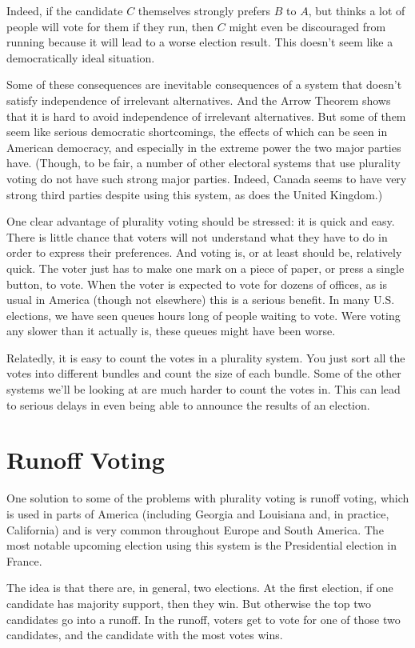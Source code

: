\begin{multicols}{2}
Indeed, if the candidate $C$ themselves strongly prefers $B$ to $A$, but thinks a lot of people will vote for them if they run, then $C$ might even be discouraged from running because it will lead to a worse election result. This doesn't seem like a democratically ideal situation.

Some of these consequences are inevitable consequences of a system that doesn't satisfy independence of irrelevant alternatives. And the Arrow Theorem shows that it is hard to avoid independence of irrelevant alternatives. But some of them seem like serious democratic shortcomings, the effects of which can be seen in American democracy, and especially in the extreme power the two major parties have. (Though, to be fair, a number of other electoral systems that use plurality voting do not have such strong major parties. Indeed, Canada seems to have very strong third parties despite using this system, as does the United Kingdom.)

One clear advantage of plurality voting should be stressed: it is quick and easy. There is little chance that voters will not understand what they have to do in order to express their preferences. And voting is, or at least should be, relatively quick. The voter just has to make one mark on a piece of paper, or press a single button, to vote. When the voter is expected to vote for dozens of offices, as is usual in America (though not elsewhere) this is a serious benefit. In many U.S. elections, we have seen queues hours long of people waiting to vote. Were voting any slower than it actually is, these queues might have been worse.

Relatedly, it is easy to count the votes in a plurality system. You just sort all the votes into different bundles and count the size of each bundle. Some of the other systems we'll be looking at are much harder to count the votes in. This can lead to serious delays in even being able to announce the results of an election.

\section{Runoff Voting}
One solution to some of the problems with plurality voting is runoff voting, which is used in parts of America (including Georgia and Louisiana and, in practice, California) and is very common throughout Europe and South America. The most notable upcoming election using this system is the Presidential election in France. 

The idea is that there are, in general, two elections. At the first election, if one candidate has majority support, then they win. But otherwise the top two candidates go into a runoff. In the runoff, voters get to vote for one of those two candidates, and the candidate with the most votes wins.


\end{multicols}
